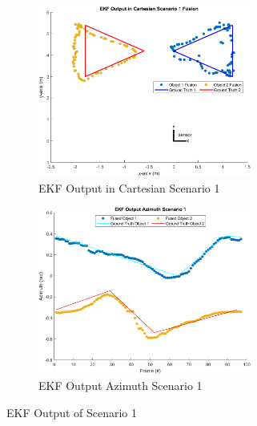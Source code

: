 \begin{figure}[!htb]
    \hspace{0.1\textwidth}
    \begin{subfigure}[b]{0.3\textwidth}%
        \includegraphics[width=7cm]{Figures/matlab/EKF Output in Cartesian Scenario 1.png}
        \caption{EKF Output in Cartesian Scenario 1}
        \label{subfig:ekf_cart_1}
    \end{subfigure}
    \hspace{0.15\textwidth}
    \begin{subfigure}[b]{0.3\textwidth}%
        \includegraphics[width=7cm]{Figures/matlab/EKF Output Azimuth Scenario 1.png}
        \caption{EKF Output Azimuth Scenario 1}
        \label{subfig:ekf_azi_1}
    \end{subfigure}

    \caption{EKF Output of Scenario 1}
    \label{fig:ekf_1}
\end{figure}


\newpage 
